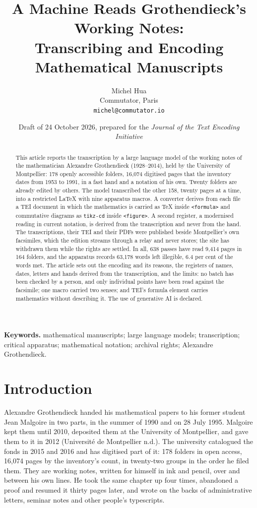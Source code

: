 \documentclass[11pt]{article}
\title{\Large A Machine Reads Grothendieck's Working Notes:\\ Transcribing and Encoding Mathematical Manuscripts}
\author{Michel Hua\\ \small Commutator, Paris\\ \small \texttt{michel@commutator.io}}
\date{\small Draft of 24 October 2026, prepared for the \emph{Journal of the Text Encoding Initiative}}
\begin{document}
\maketitle

\begin{abstract}
\noindent This article reports the transcription by a large language model of the working notes of the mathematician Alexandre Grothendieck (1928--2014), held by the University of Montpellier: 178 openly accessible folders, 16,074 digitised pages that the inventory dates from 1953 to 1991, in a fast hand and a notation of his own. Twenty folders are already edited by others. The model transcribed the other 158, twenty pages at a time, into a restricted LaTeX with nine apparatus macros. A converter derives from each file a TEI document in which the mathematics is carried as TeX inside \texttt{<formula>} and commutative diagrams as \texttt{tikz-cd} inside \texttt{<figure>}. A second register, a modernised reading in current notation, is derived from the transcription and never from the hand. The transcriptions, their TEI and their PDFs were published beside Montpellier's own facsimiles, which the edition streams through a relay and never stores; the site has withdrawn them while the rights are settled. In all, 638 passes have read 9,414 pages in 164 folders, and the apparatus records 63,178 words left illegible, 6.4 per cent of the words met. The article sets out the encoding and its reasons, the registers of names, dates, letters and hands derived from the transcription, and the limits: no batch has been checked by a person, and only individual points have been read against the facsimile; one macro carried two senses; and TEI's formula element carries mathematics without describing it. The use of generative AI is declared.
\end{abstract}

\noindent\textbf{Keywords.} mathematical manuscripts; large language models; transcription; critical apparatus; mathematical notation; archival rights; Alexandre Grothendieck.

\section{Introduction}

Alexandre Grothendieck handed his mathematical papers to his former student Jean Malgoire in two parts, in the summer of 1990 and on 28 July 1995. Malgoire kept them until 2010, deposited them at the University of Montpellier, and gave them to it in 2012 (Université de Montpellier n.d.). The university catalogued the fonds in 2015 and 2016 and has digitised part of it: 178 folders in open access, 16,074 pages by the inventory's count, in twenty-two groups in the order he filed them. They are working notes, written for himself in ink and pencil, over and between his own lines. He took the same chapter up four times, abandoned a proof and resumed it thirty pages later, and wrote on the backs of administrative letters, seminar notes and other people's typescripts.
\end{document}
